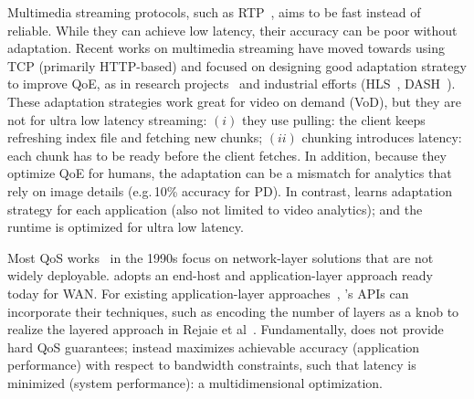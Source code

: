  Multimedia streaming protocols, such as
RTP~\cite{schulzrinne2006rtp}, aims to be fast instead of reliable. While they
can achieve low latency, their accuracy can be poor without adaptation.  Recent
works on multimedia streaming have moved towards using TCP (primarily
HTTP-based) and focused on designing good adaptation strategy to improve QoE, as
in research projects~\cite{mao2017neural, sun2016cs2p, yin2015control} and
industrial efforts (HLS~\cite{pantos2016http}, DASH~\cite{sodagar2011mpeg,
  michalos2012dynamic}). These adaptation strategies work great for video on
demand (VoD), but they are not for ultra low latency streaming: $(i)$ they use
pulling: the client keeps refreshing index file and fetching new chunks; $(ii)$
chunking introduces latency: each chunk has to be ready before the client
fetches.  In addition, because they optimize QoE for humans, the adaptation can
be a mismatch for analytics that rely on image details (e.g.\,10\% accuracy for
PD). In contrast, \sysname{} learns adaptation strategy for each application
(also not limited to video analytics); and the runtime is optimized for ultra
low latency.

 Most QoS works~\cite{ferrari1990scheme, shenker1994integrated,
  shenker1995fundamental} in the 1990s focus on network-layer solutions that are
not widely deployable. \sysname{} adopts an end-host and application-layer
approach ready today for WAN. For existing application-layer
approaches~\cite{vandalore2001survey}, \sysname{}'s APIs can incorporate their
techniques, such as encoding the number of layers as a knob to realize the
layered approach in Rejaie et al~\cite{rejaie2000layered}. Fundamentally,
\sysname{} does not provide hard QoS guarantees; instead \sysname{} maximizes
achievable accuracy (application performance) with respect to bandwidth
constraints, such that latency is minimized (system performance): a
multidimensional optimization.




